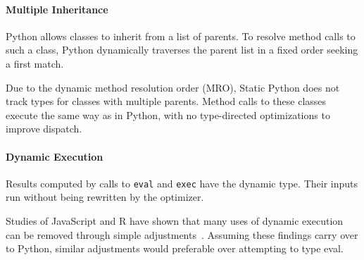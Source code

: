 \documentclass[english,cleveref,submission]{programming}
\newcommand{\SP}{Static Python}
\newcommand{\code}[1]{\texttt{#1}}
\begin{document}
\paragraph{Multiple Inheritance}


Python allows classes to inherit from a list of parents.
To resolve method calls to such a class, Python
dynamically traverses the parent list in a fixed order
seeking a first match.

Due to the dynamic method resolution order (MRO),
\SP{} does not track types for classes with multiple parents.
Method calls to these classes execute the same way as
in Python, with no type-directed optimizations to improve dispatch.


\paragraph{Dynamic Execution}


Results computed by calls to \code{eval} and \code{exec}
have the dynamic type.
Their inputs run without being rewritten by the optimizer.

Studies of JavaScript and R have shown that many uses of dynamic execution
can be removed through simple adjustments~\cite{rhbv-ecoop-2011,gdkkv-oopsla-2021,mrmv-esop-2012}.
Assuming these findings carry over to Python, similar adjustments would
preferable over attempting to type eval.


\end{document}
